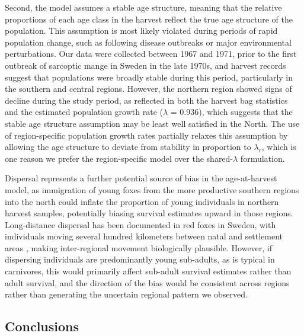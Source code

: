 \documentclass[12pt,a4paper,final,abstract=true,headings=small]{scrartcl}
\begin{document}
Second, the model assumes a stable age structure, meaning that the relative proportions of each age class in the harvest reflect the true age structure of the population. This assumption is most likely violated during periods of rapid population change, such as following disease outbreaks or major environmental perturbations. Our data were collected between 1967 and 1971, prior to the first outbreak of sarcoptic mange in Sweden in the late 1970s, and harvest records suggest that populations were broadly stable during this period, particularly in the southern and central regions. However, the northern region showed signs of decline during the study period, as reflected in both the harvest bag statistics and the estimated population growth rate ($\lambda$ = 0.936), which suggests that the stable age structure assumption may be least well satisfied in the North. The use of region-specific population growth rates partially relaxes this assumption by allowing the age structure to deviate from stability in proportion to $\lambda_r$, which is one reason we prefer the region-specific model over the shared-$\lambda$ formulation.

Dispersal represents a further potential source of bias in the age-at-harvest model, as immigration of young foxes from the more productive southern regions into the north could inflate the proportion of young individuals in northern harvest samples, potentially biasing survival estimates upward in those regions. Long-distance dispersal has been documented in red foxes in Sweden, with individuals moving several hundred kilometers between natal and settlement areas \citep{waltonLongdistanceDispersalRed2018}, making inter-regional movement biologically plausible. However, if dispersing individuals are predominantly young sub-adults, as is typical in carnivores, this would primarily affect sub-adult survival estimates rather than adult survival, and the direction of the bias would be consistent across regions rather than generating the uncertain regional pattern we observed.

\subsection*{Conclusions}
\end{document}
